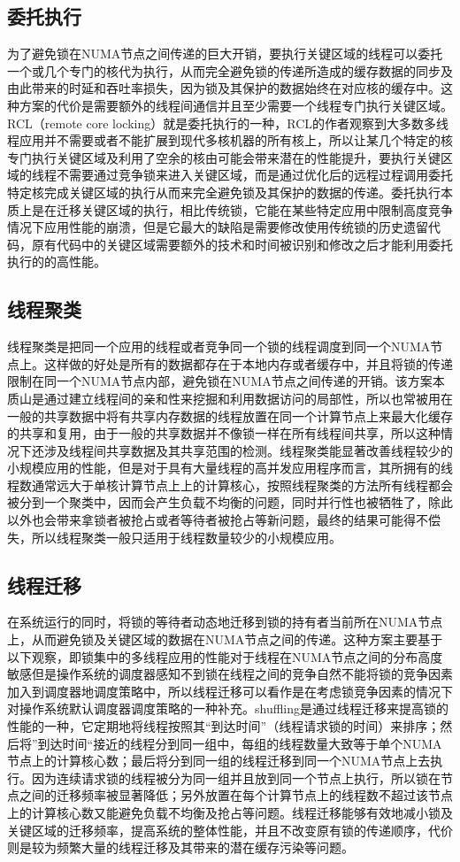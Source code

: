 \subsection{委托执行}
为了避免锁在NUMA节点之间传递的巨大开销，要执行关键区域的线程可以委托一个或几个专门的核代为执行，从而完全避免锁的传递所造成的缓存数据的同步及由此带来的时延和吞吐率损失，因为锁及其保护的数据始终在对应核的缓存中。这种方案的代价是需要额外的线程间通信并且至少需要一个线程专门执行关键区域。RCL（remote core locking）就是委托执行的一种，RCL的作者观察到大多数多线程应用并不需要或者不能扩展到现代多核机器的所有核上，所以让某几个特定的核专门执行关键区域及利用了空余的核由可能会带来潜在的性能提升，要执行关键区域的线程不需要通过竞争锁来进入关键区域，而是通过优化后的远程过程调用委托特定核完成关键区域的执行从而来完全避免锁及其保护的数据的传递。委托执行本质上是在迁移关键区域的执行，相比传统锁，它能在某些特定应用中限制高度竞争情况下应用性能的崩溃，但是它最大的缺陷是需要修改使用传统锁的历史遗留代码，原有代码中的关键区域需要额外的技术和时间被识别和修改之后才能利用委托执行的的高性能。
\subsection{线程聚类}
线程聚类是把同一个应用的线程或者竞争同一个锁的线程调度到同一个NUMA节点上。这样做的好处是所有的数据都存在于本地内存或者缓存中，并且将锁的传递限制在同一个NUMA节点内部，避免锁在NUMA节点之间传递的开销。该方案本质山是通过建立线程间的亲和性来挖掘和利用数据访问的局部性，所以也常被用在一般的共享数据中将有共享内存数据的线程放置在同一个计算节点上来最大化缓存的共享和复用，由于一般的共享数据并不像锁一样在所有线程间共享，所以这种情况下还涉及线程间共享数据及其共享范围的检测。线程聚类能显著改善线程较少的小规模应用的性能，但是对于具有大量线程的高并发应用程序而言，其所拥有的线程数通常远大于单核计算节点上上的计算核心，按照线程聚类的方法所有线程都会被分到一个聚类中，因而会产生负载不均衡的问题，同时并行性也被牺牲了，除此以外也会带来拿锁者被抢占或者等待者被抢占等新问题，最终的结果可能得不偿失，所以线程聚类一般只适用于线程数量较少的小规模应用。
\subsection{线程迁移}
在系统运行的同时，将锁的等待者动态地迁移到锁的持有者当前所在NUMA节点上，从而避免锁及关键区域的数据在NUMA节点之间的传递。这种方案主要基于以下观察，即锁集中的多线程应用的性能对于线程在NUMA节点之间的分布高度敏感但是操作系统的调度器感知不到锁在线程之间的竞争自然不能将锁的竞争因素加入到调度器地调度策略中，所以线程迁移可以看作是在考虑锁竞争因素的情况下对操作系统默认调度器调度策略的一种补充。shuffling是通过线程迁移来提高锁的性能的一种，它定期地将线程按照其“到达时间”（线程请求锁的时间）来排序；然后将”到达时间“接近的线程分到同一组中，每组的线程数量大致等于单个NUMA节点上的计算核心数；最后将分到同一组的线程迁移到同一个NUMA节点上去执行。因为连续请求锁的线程被分为同一组并且放到同一个节点上执行，所以锁在节点之间的迁移频率被显著降低；另外放置在每个计算节点上的线程数不超过该节点上的计算核心数又能避免负载不均衡及抢占等问题。线程迁移能够有效地减小锁及关键区域的迁移频率，提高系统的整体性能，并且不改变原有锁的传递顺序，代价则是较为频繁大量的线程迁移及其带来的潜在缓存污染等问题。
